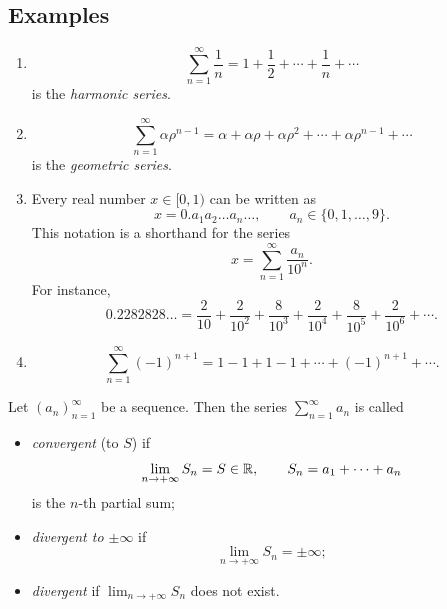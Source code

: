\subsection*{Examples}
\begin{enumerate}[label=\arabic*)]
\item
\[
\sum_{n=1}^{\infty}\frac1n
=1+\frac12+\cdots+\frac1n+\cdots
\]
is the \emph{harmonic series}.

\item
\[
\sum_{n=1}^{\infty}\alpha\rho^{n-1}
=\alpha+\alpha\rho+\alpha\rho^2+\cdots+\alpha\rho^{n-1}+\cdots
\]
is the \emph{geometric series}.

\item Every real number $x\in[0,1)$ can be written as
\[
x=0.a_1a_2\ldots a_n\ldots,
\qquad a_n\in\{0,1,\ldots,9\}.
\]
This notation is a shorthand for the series
\[
x=\sum_{n=1}^{\infty}\frac{a_n}{10^n}.
\]
For instance,
\[
0.2282828\ldots
=\frac2{10}+\frac2{10^2}+\frac8{10^3}+\frac2{10^4}
 +\frac8{10^5}+\frac2{10^6}+\cdots.
\]

\item
\[
\sum_{n=1}^{\infty}(-1)^{n+1}
=1-1+1-1+\cdots+(-1)^{n+1}+\cdots.
\]
\end{enumerate}

\begin{definition}\label{def:1.4}
Let $(a_n)_{n=1}^{\infty}$ be a sequence. Then the series $\sum_{n=1}^{\infty}a_n$ is called
\begin{itemize}
\item \emph{convergent} (to $S$) if
\[
\lim_{n\to+\infty}S_n=S\in\mathbb{R},
\qquad S_n=a_1+\cdots+a_n
\]
is the $n$-th partial sum;
\item \emph{divergent to $\pm\infty$} if
\[
\lim_{n\to+\infty}S_n=\pm\infty;
\]
\item \emph{divergent} if $\lim_{n\to+\infty}S_n$ does not exist.
\end{itemize}
\end{definition}

